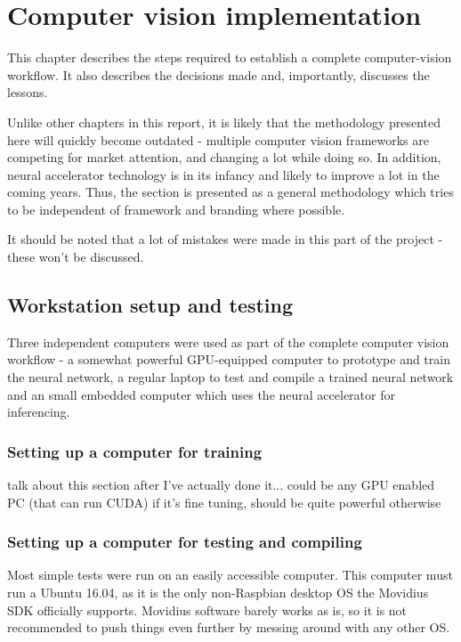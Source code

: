 \chapter{Computer vision implementation}

This chapter describes the steps required to establish a complete computer-vision workflow. It also describes the decisions made and, importantly, discusses the lessons.

Unlike other chapters in this report, it is likely that the methodology presented here will quickly become outdated - multiple computer vision frameworks are competing for market attention, and changing a lot while doing so. In addition, neural accelerator technology is in its infancy and likely to improve a lot in the coming years. Thus, the section is presented as a general methodology which tries to be independent of framework and branding where possible.

It should be noted that a lot of mistakes were made in this part of the project - these won't be discussed.

\section{Workstation setup and testing}
Three independent computers were used as part of the complete computer vision workflow - a somewhat powerful GPU-equipped computer to prototype and train the neural network, a regular laptop to test and compile a trained neural network and an small embedded computer which uses the neural accelerator for inferencing.

\subsection{Setting up a computer for training}
{\Large \color{red} talk about this section after I've actually done it...}
{\Large \color{red} could be any GPU enabled PC (that can run CUDA) if it's fine tuning, should be quite powerful otherwise}

\subsection{Setting up a computer for testing and compiling}
Most simple tests were run on an easily accessible computer. This computer must run a Ubuntu 16.04, as it is the only non-Raspbian desktop OS the Movidius SDK officially supports. Movidius software barely works as is, so it is not recommended to push things even further by messing around with any other OS.

